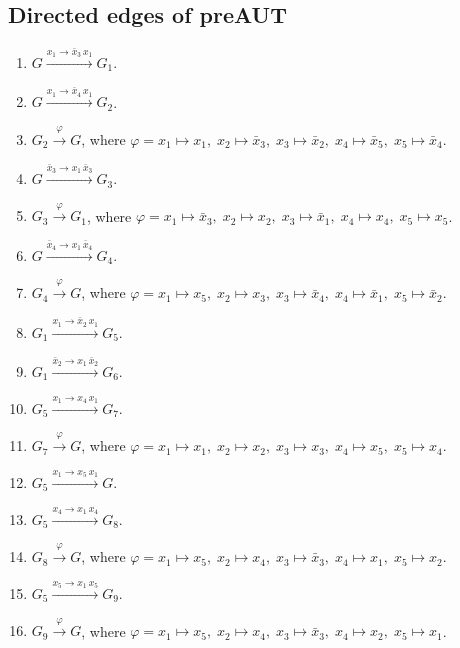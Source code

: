 \subsection*{Directed edges of preAUT}
\begin{enumerate}[leftmargin=*]
\item $G \xrightarrow{x_{1} \to \bar{x}_{3}\,x_{1}} G_{1}$.
\item $G \xrightarrow{x_{1} \to \bar{x}_{4}\,x_{1}} G_{2}$.
\item $G_{2} \xrightarrow{\varphi} G$, where $\varphi=x_{1} \mapsto x_{1},\; x_{2} \mapsto \bar{x}_{3},\; x_{3} \mapsto \bar{x}_{2},\; x_{4} \mapsto \bar{x}_{5},\; x_{5} \mapsto \bar{x}_{4}$.
\item $G \xrightarrow{\bar{x}_{3} \to x_{1}\,\bar{x}_{3}} G_{3}$.
\item $G_{3} \xrightarrow{\varphi} G_{1}$, where $\varphi=x_{1} \mapsto \bar{x}_{3},\; x_{2} \mapsto x_{2},\; x_{3} \mapsto \bar{x}_{1},\; x_{4} \mapsto x_{4},\; x_{5} \mapsto x_{5}$.
\item $G \xrightarrow{\bar{x}_{4} \to x_{1}\,\bar{x}_{4}} G_{4}$.
\item $G_{4} \xrightarrow{\varphi} G$, where $\varphi=x_{1} \mapsto x_{5},\; x_{2} \mapsto x_{3},\; x_{3} \mapsto \bar{x}_{4},\; x_{4} \mapsto \bar{x}_{1},\; x_{5} \mapsto \bar{x}_{2}$.
\item $G_{1} \xrightarrow{x_{1} \to \bar{x}_{2}\,x_{1}} G_{5}$.
\item $G_{1} \xrightarrow{\bar{x}_{2} \to x_{1}\,\bar{x}_{2}} G_{6}$.
\item $G_{5} \xrightarrow{x_{1} \to x_{4}\,x_{1}} G_{7}$.
\item $G_{7} \xrightarrow{\varphi} G$, where $\varphi=x_{1} \mapsto x_{1},\; x_{2} \mapsto x_{2},\; x_{3} \mapsto x_{3},\; x_{4} \mapsto x_{5},\; x_{5} \mapsto x_{4}$.
\item $G_{5} \xrightarrow{x_{1} \to x_{5}\,x_{1}} G$.
\item $G_{5} \xrightarrow{x_{4} \to x_{1}\,x_{4}} G_{8}$.
\item $G_{8} \xrightarrow{\varphi} G$, where $\varphi=x_{1} \mapsto x_{5},\; x_{2} \mapsto x_{4},\; x_{3} \mapsto \bar{x}_{3},\; x_{4} \mapsto x_{1},\; x_{5} \mapsto x_{2}$.
\item $G_{5} \xrightarrow{x_{5} \to x_{1}\,x_{5}} G_{9}$.
\item $G_{9} \xrightarrow{\varphi} G$, where $\varphi=x_{1} \mapsto x_{5},\; x_{2} \mapsto x_{4},\; x_{3} \mapsto \bar{x}_{3},\; x_{4} \mapsto x_{2},\; x_{5} \mapsto x_{1}$.

\end{enumerate}
